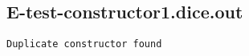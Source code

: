 \subsection{E-test-constructor1.dice.out}
\begin{verbatim}
Duplicate constructor found

\end{verbatim}